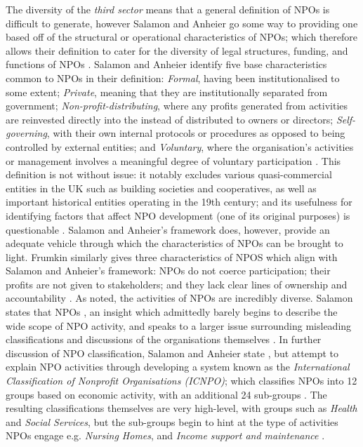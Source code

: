 The diversity of the \textit{third sector} means that a general definition of NPOs is difficult to generate, however Salamon and Anheier go some way to providing one based off of the structural or operational characteristics of NPOs; which therefore allows their definition to cater for the diversity of legal structures, funding, and functions of NPOs \cite{salamon_search_1992, frumkin_being_2009}. Salamon and Anheier identify five base characteristics common to NPOs in their definition: \textit{Formal}, having been institutionalised to some extent; \textit{Private}, meaning that they are institutionally separated from government; \textit{Non-profit-distributing}, where any profits generated from activities are reinvested directly into the  instead of distributed to owners or directors; \textit{Self-governing}, with their own internal protocols or procedures as opposed to being controlled by external entities; and \textit{Voluntary}, where the organisation's activities or management involves a meaningful degree of voluntary participation \cite{salamon_search_1992}. This definition is not without issue: it notably excludes various quasi-commercial entities in the UK such as building societies and cooperatives, as well as important historical entities operating in the 19th century; and its usefulness for identifying factors that affect NPO development (one of its original purposes) is questionable \cite{morris_defining_2000, kendall_voluntary_1996, kendall_voluntary_1996-1, steinberg_comment_1998}. Salamon and Anheier's framework does, however, provide an adequate vehicle through which the characteristics of NPOs can be brought to light. Frumkin similarly gives three characteristics of NPOS which align with Salamon and Anheier's framework: NPOs do not coerce participation; their profits are not given to stakeholders; and they lack clear lines of ownership and accountability \cite{frumkin_being_2009}.
%
%
As noted, the activities of NPOs are incredibly diverse. Salamon states that NPOs , an insight which admittedly barely begins to describe the wide scope of NPO activity, and speaks to a larger issue surrounding misleading classifications and discussions of the organisations themselves \cite{salamon_rise_1994, salamon_search_1992-1}. In further discussion of NPO classification, Salamon and Anheier state , but attempt to explain NPO activities through developing a system known as the \textit{International Classification of Nonprofit Organisations (ICNPO)}; which classifies NPOs into 12 groups based on economic activity, with an additional 24 sub-groups \cite{salamon_search_1992-1}. The resulting classifications themselves are very high-level, with groups such as \textit{Health} and \textit{Social Services}, but the sub-groups begin to hint at the type of activities NPOs engage e.g. \textit{Nursing Homes}, and \textit{Income support and maintenance} \cite{salamon_search_1992-1}.
